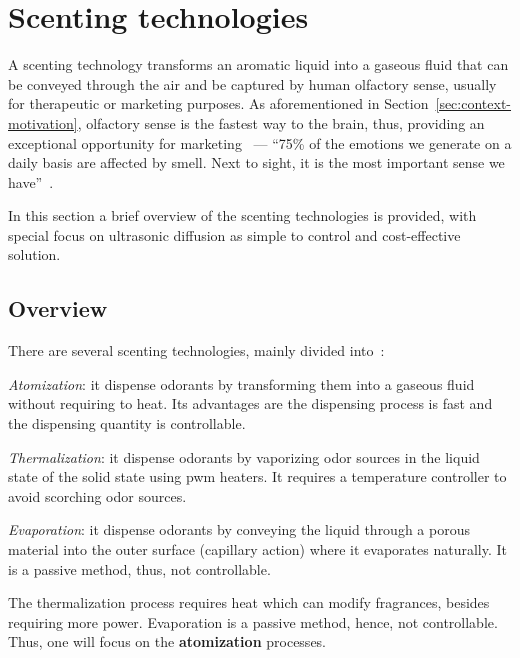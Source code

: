%
\section{Scenting technologies}
\label{sec:scenting-techn}
A scenting technology transforms an aromatic liquid into a gaseous fluid that
can be conveyed through the air and be captured by human olfactory sense,
usually for therapeutic or marketing purposes. As aforementioned in
Section~\ref{sec:context-motivation}, olfactory sense is the fastest way to the brain, thus, providing an exceptional
opportunity for marketing~\cite{news-harvard} --- ``75\% of the emotions we generate on a daily basis are affected by smell. Next
to sight, it is the most important sense we have''~\cite{lindstrom2006brand}.

In this section a brief overview of the scenting technologies is provided, with
special focus on ultrasonic diffusion as simple to control and cost-effective
solution.

\subsection{Overview}
\label{sec:overview}
There are several scenting technologies, mainly divided into~\cite{wen2019development}:
\begin{item-c}
\item \emph{Atomization}: it dispense odorants by transforming them into a
  gaseous fluid without requiring to heat. Its advantages are
  the dispensing process is fast and the dispensing quantity is controllable.
\item \emph{Thermalization}: it dispense odorants by vaporizing odor sources in
  the liquid state of the solid state using \gls{pwm} heaters. It requires a
  temperature controller to avoid scorching odor sources.
\item \emph{Evaporation}: it dispense odorants by conveying the liquid through a
  porous material into the outer surface (capillary action) where it evaporates
  naturally. It is a passive method, thus, not controllable.
\end{item-c}

The thermalization process requires heat which can modify fragrances, besides
requiring more power. Evaporation is a passive method, hence, not
controllable. Thus, one will focus on the \textbf{atomization} processes.


